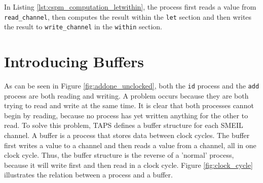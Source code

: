 In Listing \ref{lst:cspm_computation_letwithin}, the process first reads a value from \texttt{read\_channel}, then computes the result within the \texttt{let} section and then writes the result to \texttt{write\_channel} in the \texttt{within} section.
\section{Introducing Buffers}
As can be seen in Figure \ref{fig:addone_unclocked}, both the \texttt{id} process and the \texttt{add} process are both reading and writing. A problem occurs because they are both trying to read and write at the same time. It is clear that both processes cannot begin by reading, because no process has yet written anything for the other to read.
To solve this problem, TAPS defines a buffer structure for each SMEIL channel. A buffer is a process that stores data between clock cycles. The buffer first writes a value to a channel and then reads a value from a channel, all in one clock cycle. Thus, the buffer structure is the reverse of a 'normal' process, because it will write first and then read in a clock cycle. Figure \ref{fig:clock_cycle} illustrates the relation between a process and a buffer.\\


